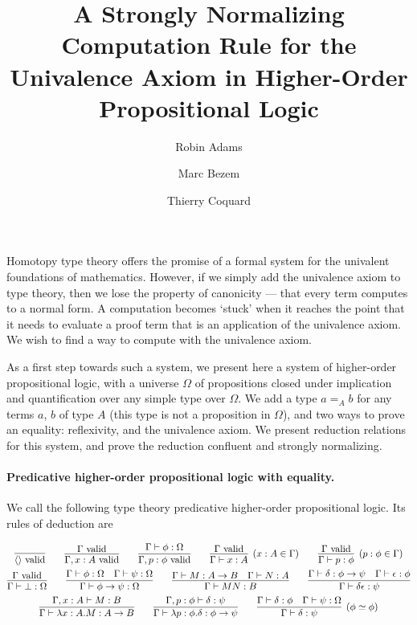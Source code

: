 \documentclass{easychair}
\title{A Strongly Normalizing Computation Rule for the Univalence Axiom in Higher-Order Propositional Logic}
\author{Robin Adams\inst{1} \and Marc Bezem\inst{1} \and Thierry Coquard\inst{2}}
\institute{Universitetet i Bergen,
Bergen, Norway \\
\email{\{robin.adams,marc\}@uib.no}
\and
University of Gothenburg,
Gothenburg, Sweden \\
\email{coquand@chalmers.se}}
\newcommand{\vald}{\ \mathrm{valid}}
\begin{document}
\maketitle

Homotopy type theory offers the promise of a formal system for the univalent foundations of mathematics.  However, if
we simply add the univalence axiom to type theory, then we lose the property of canonicity --- that every term computes to
a normal form.  A computation becomes `stuck' when it reaches the point that it needs to evaluate a proof term
that is an application of the univalence axiom.  We wish to find a way to compute with the univalence axiom.

As a first step towards such a system, we present here a system of higher-order propositional logic,  with a universe $\Omega$ of propositions
closed under implication and quantification over any simple type over $\Omega$.  We add a type $a =_A b$ for any terms $a$, $b$ of type $A$
(this type is not a proposition in $\Omega$), and two ways to prove an equality: reflexivity, and the univalence axiom.  We present
reduction relations for this system, and prove the reduction confluent and strongly normalizing.

\paragraph{Predicative higher-order propositional logic with equality.}

We call the following type theory predicative higher-order propositional logic.  Its rules of deduction are

\begin{gather*}
\infer{\langle \rangle \vald}{} \qquad
\infer{\Gamma, x : A \vald}{\Gamma \vald} \qquad 
\infer{\Gamma, p : \phi \vald}{\Gamma \vdash \phi : \Omega} \qquad
\infer[(x : A \in \Gamma)]{\Gamma \vdash x : A}{\Gamma \vald} \qquad
\infer[(p : \phi \in \Gamma)]{\Gamma \vdash p : \phi}{\Gamma \vald} \\
\infer{\Gamma \vdash \bot : \Omega}{\Gamma \vald} \qquad
\infer{\Gamma \vdash \phi \rightarrow \psi : \Omega}{\Gamma \vdash \phi : \Omega \quad \Gamma \vdash \psi : \Omega} \qquad
\infer{\Gamma \vdash M N : B} {\Gamma \vdash M : A \rightarrow B \quad \Gamma \vdash N : A} \qquad
\infer{\Gamma \vdash \delta \epsilon : \psi} {\Gamma \vdash \delta : \phi \rightarrow \psi \quad \Gamma \vdash \epsilon : \phi} \\
\infer{\Gamma \vdash \lambda x:A.M : A \rightarrow B}{\Gamma, x : A \vdash M : B} \qquad
\infer{\Gamma \vdash \lambda p : \phi . \delta : \phi \rightarrow \psi}{\Gamma, p : \phi \vdash \delta : \psi} \qquad
\infer[(\phi \simeq \phi)]{\Gamma \vdash \delta : \psi}{\Gamma \vdash \delta : \phi \quad \Gamma \vdash \psi : \Omega}
\end{gather*}
\end{document}
